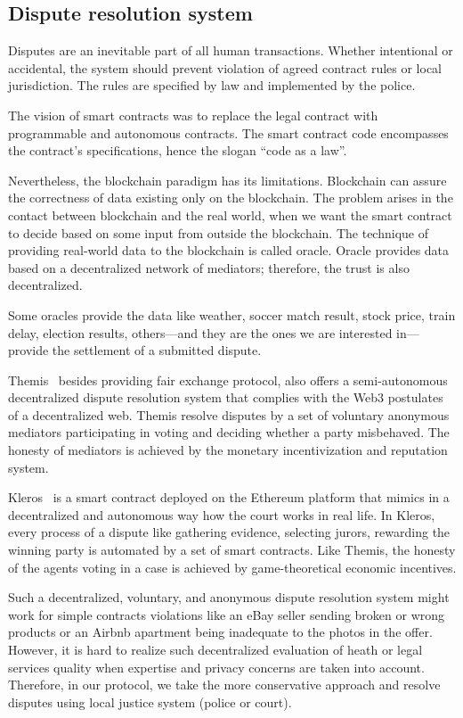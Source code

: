 \documentclass{ieeeaccess}
\begin{document}
\subsection{Dispute resolution system}

Disputes are an inevitable part of all human transactions. Whether intentional or accidental, the system should prevent violation of agreed contract rules or local jurisdiction. The rules are specified by law and implemented by the police.

The vision of smart contracts was to replace the legal contract with
programmable and autonomous contracts. The smart contract code encompasses the contract's specifications, hence the slogan ``code as a law''. 

Nevertheless, the blockchain paradigm has its limitations. Blockchain can assure the correctness of data existing only on the blockchain. The problem arises in the contact between blockchain and the real world, when we want the smart contract to decide based on some input from outside the blockchain. The technique of providing real-world data to the blockchain is called oracle. Oracle provides data based on a decentralized network of mediators; therefore, the trust is also decentralized.

Some oracles provide the data like weather, soccer match result, stock
price, train delay, election results, others—and they are the ones we
are interested in—provide the settlement of a submitted dispute.

Themis~\cite{meng2019themis} besides providing fair exchange protocol,
also offers a semi-autonomous decentralized dispute resolution system that complies with the Web3 postulates of a decentralized web. Themis
resolve disputes by a set of voluntary anonymous mediators participating
in voting and deciding whether a party misbehaved. The honesty of
mediators is achieved by the monetary incentivization and reputation
system.

Kleros~\cite{lesaege2018kleros} is a smart contract deployed on the Ethereum platform that mimics in a decentralized and autonomous way how the court works in real life. In Kleros, every process of a dispute like gathering evidence, selecting jurors, rewarding the winning party is automated by a set of smart contracts. Like Themis, the honesty of the agents voting in a case is achieved by game-theoretical economic incentives.

Such a decentralized, voluntary, and anonymous dispute resolution system might work for simple contracts violations like an eBay seller sending broken or wrong products or an Airbnb apartment being inadequate to the photos in the offer. However, it is hard to realize such decentralized evaluation of heath or legal services quality when expertise and privacy concerns are taken into account. Therefore, in our protocol, we take the more conservative approach and resolve disputes using local
justice system (police or court).
\end{document}
